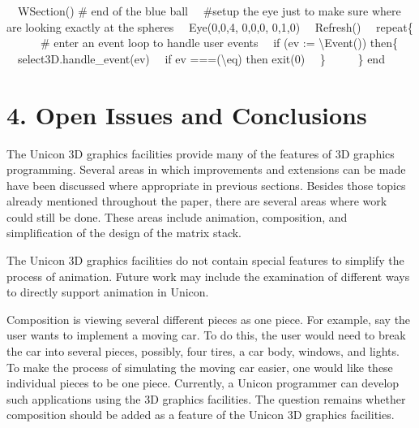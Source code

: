\documentclass[letterpaper]{article}
\begin{document}
{{ \ \ WSection() \# end of the blue ball \newline
\newline
 \ \ \#setup the eye just to make sure where are looking exactly at the spheres\newline
 \ \ Eye(0,0,4, 0,0,0, 0,1,0)\newline
 \ \ Refresh() \newline
 \ \ repeat\{ \ \ \ \ \ \ \# enter an event loop to handle user events \newline
 \ \ if (ev := {\textbackslash}Event()) then\{\newline
\ \  select3D.handle\_event(ev)\newline
\ \  if ev ===({\textquotedbl}{\textbackslash}e{\textquotedbl}{\textbar}{\textquotedbl}q{\textquotedbl}) then
exit(0)\newline
\ \  \} \newline
 \ \ \ \ \ \}\newline
end}



\section[4. Open Issues and Conclusions]{4. Open Issues and Conclusions}


The Unicon 3D graphics facilities provide many of the features of 3D
graphics programming. Several areas in which improvements and
extensions can be made have been discussed where appropriate in
previous sections. Besides those topics already mentioned throughout
the paper, there are several areas where work could still be
done. These areas include animation, composition, and simplification
of the design of the matrix stack.

The Unicon 3D graphics facilities do not contain special features to
simplify the process of animation. Future work may include the
examination of different ways to directly support animation in Unicon.

Composition is viewing several different pieces as one piece. For
example, say the user wants to implement a moving car.  To do this,
the user would need to break the car into several pieces, possibly,
four tires, a car body, windows, and lights. To make the process of
simulating the moving car easier, one would like these individual
pieces to be one piece. Currently, a Unicon programmer can develop
such applications using the 3D graphics facilities. The question
remains whether composition should be added as a feature of the Unicon
3D graphics facilities.

}
\end{document}
